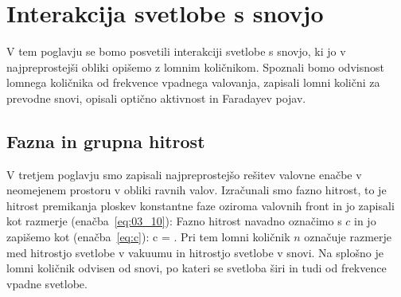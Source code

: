 
\chapter{Interakcija svetlobe s snovjo}
V tem poglavju se bomo posvetili interakciji svetlobe s snovjo, ki jo 
v najpreprostejši obliki opišemo z lomnim količnikom. Spoznali bomo 
odvisnost lomnega količnika od frekvence vpadnega valovanja, zapisali
lomni količni za prevodne snovi, opisali optično aktivnost in Faradayev 
pojav.

\section{Fazna in grupna hitrost}
V tretjem poglavju smo zapisali najpreprostejšo rešitev valovne enačbe
v neomejenem prostoru v obliki ravnih valov. Izračunali smo fazno hitrost,
to je hitrost premikanja ploskev konstantne faze oziroma valovnih front in
jo zapisali kot razmerje (enačba~\ref{eq:03_10}):
Fazno hitrost navadno označimo s $c$ in jo zapišemo kot (enačba~\ref{eq:c}):
\beq
c = .
\label{eq:09_01}
\eeq
Pri tem lomni količnik $n$ označuje razmerje med hitrostjo svetlobe v 
vakuumu in hitrostjo svetlobe v snovi. Na splošno je lomni količnik odvisen 
od snovi, po kateri se svetloba širi in tudi od frekvence vpadne svetlobe.

